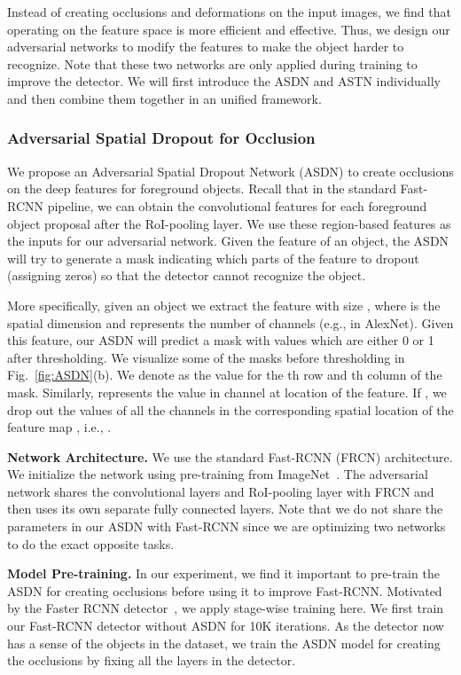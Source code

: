 \documentclass[10pt,twocolumn,letterpaper]{article}
\begin{document}
Instead of creating occlusions and deformations on the input images, we find that operating on the feature space is more efficient and effective. Thus, we design our adversarial networks to modify the features to make the object harder to recognize. Note that these two networks are only applied during training to improve the detector. We will first introduce the ASDN and ASTN individually and then combine them together in an unified framework. 


\subsubsection{Adversarial Spatial Dropout for Occlusion}
We propose an Adversarial Spatial Dropout Network (ASDN) to create occlusions on the deep features for foreground objects. Recall that in the standard Fast-RCNN pipeline, we can obtain the convolutional features for each foreground object proposal after the RoI-pooling layer. We use these region-based features as the inputs for our adversarial network. Given the feature of an object, the ASDN will try to generate a mask indicating which parts of the feature to dropout (assigning zeros) so that the detector cannot recognize the object.

More specifically, given an object we extract the feature  with size , where  is the spatial dimension and   represents the number of channels (e.g.,  in AlexNet). Given this feature, our ASDN will predict a mask  with  values which are either 0 or 1 after thresholding. We visualize some of the masks before thresholding in Fig.~\ref{fig:ASDN}(b). We denote  as the value for the th row and th column of the mask. Similarly,  represents the value in channel  at location  of the feature. If , we drop out the values of all the channels in the corresponding spatial location of the feature map , i.e., . 

\textbf{Network Architecture.} We use the standard Fast-RCNN (FRCN) architecture. We initialize the network using pre-training from ImageNet~\cite{imagenet}.  The adversarial network shares the convolutional layers and RoI-pooling layer with FRCN and then uses its own separate fully connected layers. Note that we do not share the parameters in our ASDN with Fast-RCNN since we are optimizing two networks to do the exact opposite tasks. 

\textbf{Model Pre-training.} In our experiment, we find it important to pre-train the ASDN for creating occlusions before using it to improve Fast-RCNN. Motivated by the Faster RCNN detector~\cite{renNIPS15fasterrcnn}, we apply stage-wise training here. We first train our Fast-RCNN detector without ASDN for 10K iterations. As the detector now has a sense of the objects in the dataset, we train the ASDN model for creating the occlusions by fixing all the layers in the detector.
\end{document}
